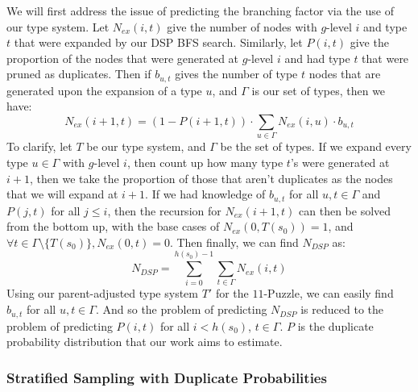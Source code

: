 \documentclass{article}
\begin{document}
We will first address the issue of predicting the branching factor via the use of
our type system.
Let \(N_{ex}(i, t)\) give the number of nodes with \(g\)-level \(i\) and type \(t\) that were expanded
by our DSP BFS search.
Similarly, let \(P(i, t)\) give the proportion of the nodes
that were generated at \(g\)-level \(i\) and had type \(t\) that were
pruned as duplicates.
Then if \(b_{u,t}\) gives the number of type \(t\) nodes that are generated upon
the expansion of a type \(u\), and \(\Gamma\) is our set of types, then we have:
\[N_{ex}(i+1, t) = (1 - P(i+1, t)) \cdot \sum_{u \in \Gamma} N_{ex}(i, u) \cdot b_{u,t}\]
To clarify, let \(T\) be our type system, and \(\Gamma\) be the set of types.
If we expand every type \(u \in \Gamma\) with \(g\)-level \(i\),
 then count up how many type \(t\)'s were generated at \(i+1\),
 then we take the proportion of those that aren't duplicates as the
 nodes that we will expand at \(i+1\).
 If we had knowledge of \(b_{u,t}\) for all \(u,t \in \Gamma\) and \(P(j, t)\) for all \(j \leq i\),
 then the recursion for \(N_{ex}(i + 1, t)\) can then be solved from the bottom up,
 with the base cases of \(N_{ex}(0, T(s_0)) = 1\), and \(\forall t \in \Gamma \setminus \{T(s_0)\}, N_{ex}(0, t) = 0\).
 Then finally, we can find \(N_{DSP}\) as: \\
 \[N_{DSP} = \sum_{i=0}^{h(s_0) - 1} \sum_{t \in \Gamma} N_{ex}(i, t)\]
Using our parent-adjusted type system \(T'\) for the \(11\)-Puzzle,
we can easily find \(b_{u,t}\) for all \(u,t \in \Gamma\).
And so the problem of predicting \(N_{DSP}\) is reduced to
the problem of predicting \(P(i, t)\) for all \(i < h(s_0)\), \(t \in \Gamma\).
\(P\) is the duplicate probability distribution that our work aims to estimate.

\subsubsection*{Stratified Sampling with Duplicate Probabilities}
\end{document}
